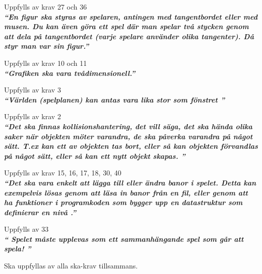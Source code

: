 \documentclass{TDP005mall}
\begin{document}
Uppfylls av krav 27 och 36\\

\textit{\textbf{``En figur ska styras av spelaren, antingen med tangentbordet eller med musen. Du kan även göra ett spel där man spelar två stycken genom att dela på tangentbordet (varje spelare använder olika tangenter). Då styr man var sin figur.''}}


Uppfylls av krav 10 och 11\\

\textit{\textbf{``Grafiken ska vara tvådimensionell.''}}


Uppfylls av krav 3\\

\textit{\textbf{``Världen (spelplanen) kan antas vara lika stor som fönstret ''}}


Uppfylls av krav 2\\

\textit{\textbf{``Det ska finnas kollisionshantering, det vill säga, det ska hända olika saker när objekten möter varandra, de ska påverka varandra på något sätt. T.ex kan ett av objekten tas bort, eller så kan objekten förvandlas på något sätt, eller så kan ett nytt objekt skapas. ''}}


Uppfylls av krav 15, 16, 17, 18, 30, 40\\

\textit{\textbf{``Det ska vara enkelt att lägga till eller ändra banor i spelet. Detta kan exempelvis lösas genom att läsa in banor från en fil, eller genom att ha funktioner i programkoden som bygger upp en datastruktur som definierar en  nivå .''}}


Uppfylls av 33\\

\textit{\textbf{`` Spelet måste upplevas som ett sammanhängande spel som går att spela! ''}}

Ska uppfyllas av alla ska-krav tillsammans.
\end{document}
